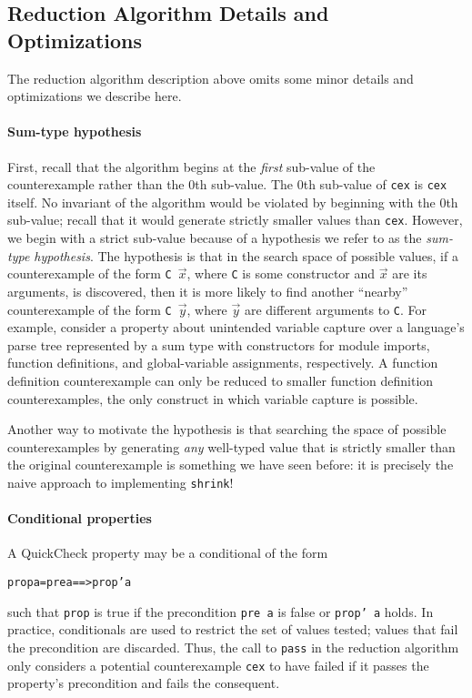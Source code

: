 \documentclass[10pt]{sigplanconf}
\newenvironment{code}{\begin{alltt}}{\end{alltt}}
\newcommand{\ttp}[1]{\texttt{#1}}
\begin{document}
\subsection{Reduction Algorithm Details and Optimizations}
The reduction algorithm description above omits some minor details and
optimizations we describe here.

\paragraph{Sum-type hypothesis}
First, recall that the algorithm begins at the \emph{first} sub-value of the
counterexample rather than the 0th sub-value.  The 0th sub-value of \ttp{cex} is
\ttp{cex} itself.  No invariant of the algorithm would be violated by beginning
with the 0th sub-value; recall that it would generate strictly smaller values
than \ttp{cex}.  However, we begin with a strict sub-value because of a
hypothesis we refer to as the \emph{sum-type hypothesis}.  The hypothesis is
that in the search space of possible values, if a counterexample of the form
\ttp{C}~$\vec{x}$, where \ttp{C} is some constructor and $\vec{x}$ are its
arguments, is discovered, then it is more likely to find another ``nearby''
counterexample of the form \ttp{C}~$\vec{y}$, where $\vec{y}$ are different
arguments to \ttp{C}.  For example, consider a property about unintended
variable capture over a language's parse tree represented by a sum type with
constructors for module imports, function definitions, and global-variable
assignments, respectively.  A function definition counterexample can only be
reduced to smaller function definition counterexamples, the only construct in
which variable capture is possible.

Another way to motivate the hypothesis is that searching the space of possible
counterexamples by generating \emph{any} well-typed value that is strictly
smaller than the original counterexample is something we have seen before: it is
precisely the naive approach to implementing \ttp{shrink}!  

\paragraph{Conditional properties}
A QuickCheck property may be a conditional of the form
%
\begin{code}
prop a = pre a ==> prop' a
\end{code}
%
\noindent
such that \ttp{prop} is true if the precondition \ttp{pre a} is false or
\ttp{prop' a} holds.  In practice, conditionals are used to restrict the set of
values tested; values that fail the precondition are discarded.  Thus, the call
to \ttp{pass} in the reduction algorithm only considers a potential
counterexample \ttp{cex} to have failed if it passes the property's
precondition and fails the consequent.
\end{document}
